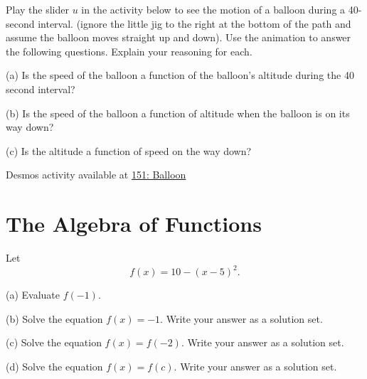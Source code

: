 \documentclass{ximera}
\begin{document}
\begin{question}  \label{Q:4sdfdsfdellk}

Play the slider $u$ in the activity below to see the motion of a balloon during a 40-second interval. (ignore the little jig to the right at the bottom of the path and assume the balloon moves straight up and down). Use the animation to answer the following questions. Explain your reasoning for each.

(a) Is the speed of the balloon a function of the balloon's altitude during the 40 second interval?

(b) Is the speed of the balloon a function of altitude when the balloon is on its way down?

(c) Is the altitude a function of speed on the way down?







\begin{onlineOnly}
    \begin{center}
\end{center}
\end{onlineOnly}

Desmos activity available at \href{https://www.desmos.com/calculator/amv52b9ljt}{151: Balloon}

\end{question}


\section{The Algebra of Functions}


\begin{question} \label{Q9844230}
Let 
\[
     f(x) = 10 - (x-5)^2 .
\]

(a) Evaluate $f(-1)$.

(b) Solve the equation $f(x)=-1$. Write your answer as a solution set.

(c) Solve the equation $f(x) = f(-2)$. Write your answer as a solution set.

(d) Solve the equation $f(x) = f(c)$. Write your answer as a solution set.

\end{question}
\end{document}
